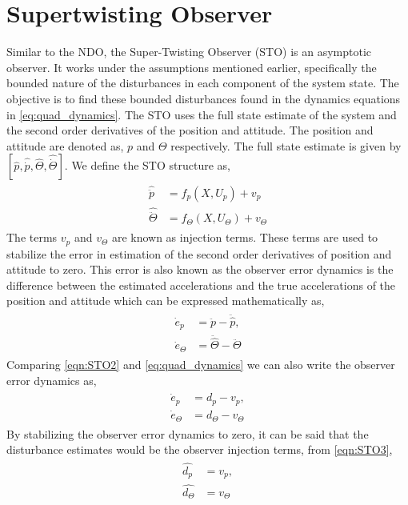 \documentclass[letterpaper%
, twoside%
, 12pt%
,memoire%
, english%
,creativecommons,hyperref%
]{thETS}
\theoremstyle{newThmStyle}
\begin{document}
\section{Supertwisting Observer} \label{Sec:STO}
Similar to the NDO, the Super-Twisting Observer (STO) is an asymptotic observer. It works under the assumptions mentioned earlier, specifically the bounded nature of the disturbances in each component of the system state. The objective is to find these bounded disturbances found in the dynamics equations in \eqref{eq:quad_dynamics}.
The STO uses the full state estimate of the system and the second order derivatives of the position and attitude. The position and attitude are denoted as, $p$ and $\Theta$ respectively. The full state estimate is given by $[\hat{p}, \hat{\dot{p}}, \hat{\Theta}, \hat{\dot{\Theta}}]$. We define the STO structure as, 
\begin{align} \label{eqn:STO1}
\begin{aligned}
\hat{\ddot{p}}&=f_p(X,U_p)+v_p \\
\hat{\ddot{\Theta}}&=f_\Theta(X,U_\Theta)+v_\Theta 
\end{aligned}
\end{align}
The terms $v_p$ and $v_\Theta$ are known as injection terms. These terms are used to stabilize the error in estimation of the second order derivatives of position and attitude to zero. This error is also known as the observer error dynamics is the difference between the estimated accelerations and the true accelerations of the position and attitude which can be expressed mathematically as, 
\begin{align}\label{eqn:STO2}
\begin{aligned}
\dot{e}_p&=\ddot{p}-\ddot{\hat{p}}, \\
\dot{e}_\Theta&=\ddot{\hat{\Theta}}-\ddot{\Theta}
\end{aligned}
\end{align}
Comparing \eqref{eqn:STO2} and \eqref{eq:quad_dynamics} we can also write the observer error dynamics as, 
\begin{align}\label{eqn:STO3} 
\begin{aligned}
\dot{e}_p&=d_p-v_p, \\
\dot{e}_\Theta&=d_\Theta-v_\Theta
\end{aligned}
\end{align}
By stabilizing the observer error dynamics to zero, it can be said that the disturbance estimates would be the observer injection terms, from \eqref{eqn:STO3}, 
\begin{align}\label{eqn:STO4} 
\begin{aligned}
\hat{d_p}&=v_p, \\
\hat{d_\Theta}&=v_\Theta
\end{aligned}
\end{align}
\end{document}
